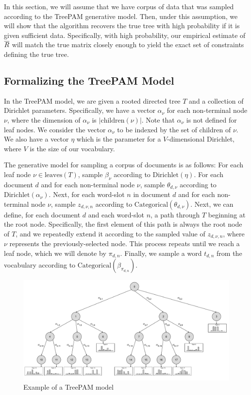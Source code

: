 \documentclass{article}
\theoremstyle{definition}
\newcommand{\Dirichlet}{\text{Dirichlet}}
\newcommand{\Categorical}{\text{Categorical}}
\newcommand{\leaves}{\text{leaves}}
\begin{document}
In this section, we will assume that we have corpus of data that was sampled according to the TreePAM generative model.
Then, under this assumption, we will show that the algorithm recovers the true tree with high probability if it is given sufficient data.
Specifically, with high probability, our empirical estimate of $\overline{R}$ will match the true matrix closely enough to yield the exact set of constraints defining the true tree.

\subsection{Formalizing the TreePAM Model}

In the TreePAM model, we are given a rooted directed tree $T$ and a collection of Dirichlet parameters.
Specifically, we have a vector $\alpha_\nu$ for each non-terminal node $\nu$, where the dimension of $\alpha_\nu$ is $|\text{children}(\nu)|$.
Note that $\alpha_\nu$ is not defined for leaf nodes.
We consider the vector $\alpha_\nu$ to be indexed by the set of children of $\nu$.
We also have a vector $\eta$ which is the parameter for a $V$-dimensional Dirichlet, where $V$ is the size of our vocabulary.

The generative model for sampling a corpus of documents is as follows:
For each leaf node $\nu \in \leaves(T)$, sample $\beta_\nu$ according to $\Dirichlet(\eta)$.
For each document $d$ and for each non-terminal node $\nu$, sample $\theta_{d,\nu}$ according to $\Dirichlet(\alpha_\nu)$.
Next, for each word-slot $n$ in document $d$ and for each non-terminal node $\nu$, sample $z_{d,\nu,n}$ according to $\Categorical(\theta_{d,\nu})$.
Next, we can define, for each document $d$ and each word-slot $n$, a path through $T$ beginning at the root node.
Specifically, the first element of this path is always the root node of $T$, and we repeatedly extend it according to the sampled value of $z_{d,\nu,n}$, where $\nu$ represents the previously-selected node.
This process repeats until we reach a leaf node, which we will denote by $\pi_{d,n}$.
Finally, we sample a word $t_{d,n}$ from the vocabulary according to $\Categorical(\beta_{\pi_{d,n}})$.

\begin{figure}[hbt]
    \centering
    \includegraphics[width=\textwidth]{figures/treepam-diagram.pdf}
    \caption{Example of a TreePAM model}
    \label{fig:treepam-diagram}
\end{figure}
\end{document}
